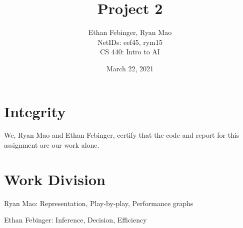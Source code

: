 \documentclass[12pt, twoside]{article}
\newcommand{\name}{Ethan Febinger, Ryan Mao \\ NetIDs: eef45, rym15}
\newcommand{\class}{CS 440: Intro to AI}
\newcommand{\hwTitle}{Project 2} %
\newcommand{\due}{March 22, 2021} %
\begin{document}
 
 
\title{\hwTitle} %
\author{\name\\  %
\class} %
\date{\due}

\maketitle

\section*{Integrity}

We, Ryan Mao and Ethan Febinger, certify that the code and report for this assignment are our work alone.

\section*{Work Division}

    Ryan Mao: Representation, Play-by-play, Performance graphs

    \noindent Ethan Febinger: Inference, Decision, Efficiency


\tableofcontents
\vfill
\pagebreak
\end{document}
